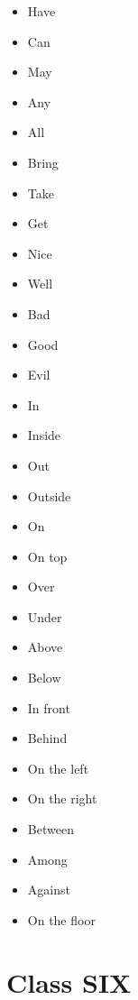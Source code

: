 \documentclass[12pt,a4paper]{article} %
\begin{document}
\begin{itemize}
		\item Have
		\item Can
		\item May
		\item Any
		\item All
		\item Bring
		\item Take
		\item Get
		\item Nice
		\item Well
		\item Bad
		\item Good
		\item Evil
		\item In
		\item Inside
		\item Out
		\item Outside
		\item On
		\item On top
		\item Over
		\item Under
		\item Above
		\item Below
		\item In front
		\item Behind
		\item On the left
		\item On the right
		\item Between
		\item Among
		\item Against
		\item On the floor
	\end{itemize}
\section{Class SIX}
\end{document}

